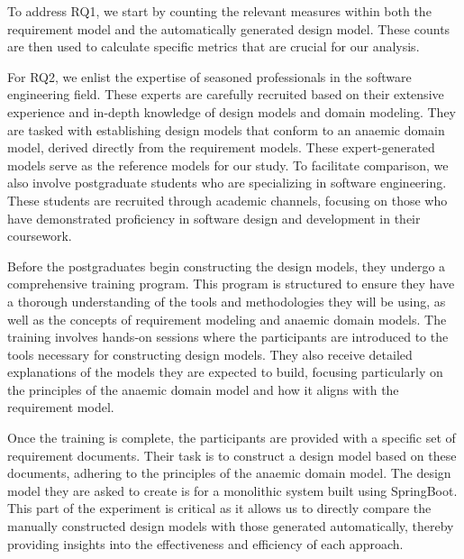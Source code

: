 \documentclass[pdflatex,sn-mathphys-num]{sn-jnl}%
\theoremstyle{thmstyleone}%
\theoremstyle{thmstyletwo}%
\theoremstyle{thmstylethree}%
\begin{document}
To address RQ1, we start by counting the relevant measures within both the requirement model and the automatically generated design model. These counts are then used to calculate specific metrics that are crucial for our analysis.

For RQ2, we enlist the expertise of seasoned professionals in the software engineering field. These experts are carefully recruited based on their extensive experience and in-depth knowledge of design models and domain modeling. They are tasked with establishing design models that conform to an anaemic domain model, derived directly from the requirement models. These expert-generated models serve as the reference models for our study. To facilitate comparison, we also involve postgraduate students who are specializing in software engineering. These students are recruited through academic channels, focusing on those who have demonstrated proficiency in software design and development in their coursework.

Before the postgraduates begin constructing the design models, they undergo a comprehensive training program. This program is structured to ensure they have a thorough understanding of the tools and methodologies they will be using, as well as the concepts of requirement modeling and anaemic domain models. The training involves hands-on sessions where the participants are introduced to the tools necessary for constructing design models. They also receive detailed explanations of the models they are expected to build, focusing particularly on the principles of the anaemic domain model and how it aligns with the requirement model.

Once the training is complete, the participants are provided with a specific set of requirement documents. Their task is to construct a design model based on these documents, adhering to the principles of the anaemic domain model. The design model they are asked to create is for a monolithic system built using SpringBoot. This part of the experiment is critical as it allows us to directly compare the manually constructed design models with those generated automatically, thereby providing insights into the effectiveness and efficiency of each approach.
\end{document}
